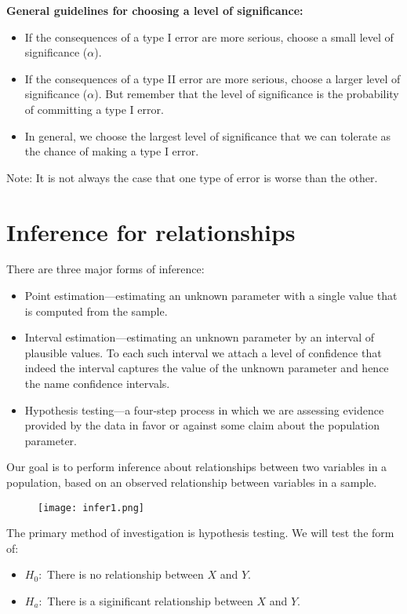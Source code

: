 \documentclass[10pt, a4paper]{article}
\begin{document}
\textbf{General guidelines for choosing a level of significance:}
\begin{itemize}
\item If the consequences of a type I error are more serious, choose a small level of significance ($\alpha$).
\item If the consequences of a type II error are more serious, choose a larger level of significance ($\alpha$). But remember that the level of significance is the probability of committing a type I error.
\item In general, we choose the largest level of significance that we can tolerate as the chance of making a type I error.
\end{itemize}
Note: It is not always the case that one type of error is worse than the other.
\section{Inference for relationships}
There are three major forms of inference:
\begin{itemize}
\item Point estimation---estimating an unknown parameter with a single value that is computed from the sample.
\item Interval estimation---estimating an unknown parameter by an interval of plausible values. To each such interval we attach a level of confidence that indeed the interval captures the value of the unknown parameter and hence the name confidence intervals.
\item Hypothesis testing---a four-step process in which we are assessing evidence provided by the data in favor or against some claim about the population parameter.
\end{itemize}
Our goal is to perform inference about relationships between two variables in a population, based on an observed relationship between variables in a sample. 
\begin{figure}
[h!]
\centering
\texttt{[image: infer1.png]}
\end{figure}
The primary method of investigation is hypothesis testing. We will test the form of:
\begin{itemize}
\item $H_0:$ There is no relationship between $X$ and $Y$.
\item $H_a:$ There is a siginificant relationship between $X$ and $Y$.
\end{itemize}
\end{document}
